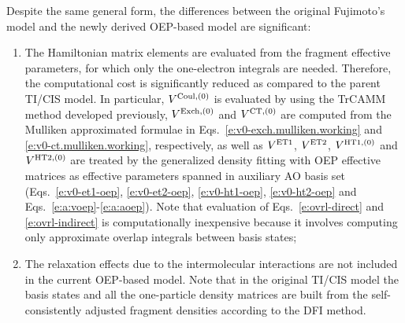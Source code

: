 Despite the same general form,
the differences between the original Fujimoto's model and the newly derived OEP\hyp{}based model 
are significant:
%
\begin{enumerate}
 \item The Hamiltonian matrix elements are evaluated from the fragment effective 
parameters, for which only the one\hyp{}electron integrals are needed. Therefore, the computational
cost is significantly reduced as compared to the parent TI/CIS model. In particular, 
$V^{{\rm Coul},(0)}$ is evaluated by using the TrCAMM method developed previously,
$V^{{\rm Exch},(0)}$ and $V^{{\rm CT},(0)}$ are computed from the Mulliken approximated
formulae in Eqs.~\eqref{e:v0-exch.mulliken.working} and \eqref{e:v0-ct.mulliken.working}, respectively,
as well as $V^{\rm ET1}$, $V^{\rm ET2}$,
$V^{{\rm HT1},(0)}$ and $V^{{\rm HT2},(0)}$ are treated by the generalized density fitting
with OEP effective matrices as effective parameters spanned in auxiliary AO basis set 
(Eqs.~\eqref{e:v0-et1-oep}, \eqref{e:v0-et2-oep}, \eqref{e:v0-ht1-oep}, \eqref{e:v0-ht2-oep}
and Eqs.~\eqref{e:a:voep}-\eqref{e:a:aoep}). Note that evaluation
of Eqs.~\eqref{e:ovrl-direct} and \eqref{e:ovrl-indirect} 
is computationally inexpensive because it involves computing only approximate overlap
integrals between basis states;
 \item The relaxation effects due to the intermolecular interactions are not included
in the current OEP\hyp{}based model.
Note that in the original TI/CIS model the basis states and all the one\hyp{}particle density matrices are built from the
self\hyp{}consistently adjusted fragment densities according to the DFI method.
\end{enumerate}
%
%

